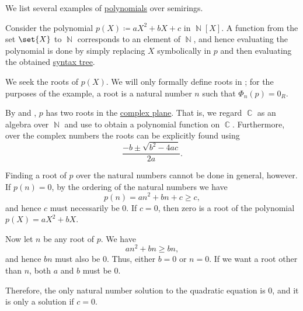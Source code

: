 \begin{example}\label{ex:def:polynomial_algebra}
  We list several examples of \hyperref[def:polynomial_algebra]{polynomials} over semirings.
  \begin{thmenum}
     Consider the polynomial \( p(X) \coloneqq aX^2 + bX + c \) in \( \BbbN[X] \). A function from the set \( \set{ X } \) to \( \BbbN \) corresponds to an element of \( \BbbN \), and hence evaluating the polynomial is done by simply replacing \( X \) symbolically in \( p \) and then evaluating the obtained \hyperref[rem:binary_operation_syntax_trees]{syntax tree}.

    We seek the roots of \( p(X) \). We will only formally define roots in ; for the purposes of the example, a root is a natural number \( n \) such that \( \Phi_n(p) = 0_R \).

    By  and , \( p \) has two roots in the \hyperref[def:complex_numbers]{complex plane}. That is, we regard \( \BbbC \) as an algebra over \( \BbbN \) and use  to obtain a polynomial function on \( \BbbC \). Furthermore, over the complex numbers the roots can be explicitly found using
    \begin{equation*}
      \frac {-b \pm \sqrt{b^2 - 4ac}} {2a}.
    \end{equation*}

    Finding a root of \( p \) over the natural numbers cannot be done in general, however. If \( p(n) = 0 \), by the ordering of the natural numbers we have
    \begin{equation*}
      p(n) = an^2 + bn + c \geq c,
    \end{equation*}
    and hence \( c \) must necessarily be \( 0 \). If \( c = 0 \), then zero is a root of the polynomial \( p(X) = aX^2 + bX \).

    Now let \( n \) be any root of \( p \). We have
    \begin{equation*}
      an^2 + bn \geq bn,
    \end{equation*}
    and hence \( bn \) must also be \( 0 \). Thus, either \( b = 0 \) or \( n = 0 \). If we want a root other than \( n \), both \( a \) and \( b \) must be \( 0 \).

    Therefore, the only natural number solution to the quadratic equation is \( 0 \), and it is only a solution if \( c = 0 \).


\end{thmenum}
\end{example}
